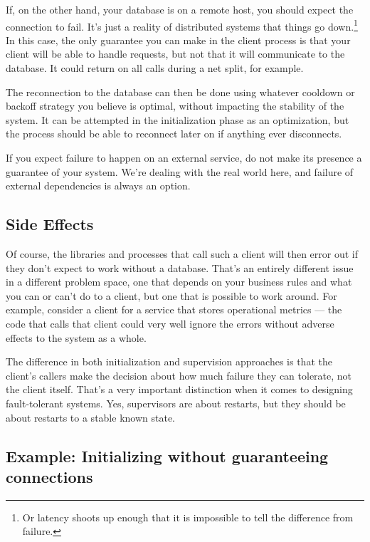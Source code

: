 If, on the other hand, your database is on a remote host, you should expect the connection to fail. It's just a reality of distributed systems that things go down.\footnote{Or latency shoots up enough that it is impossible to tell the difference from failure.} In this case, the only guarantee you can make in the client process is that your client will be able to handle requests, but not that it will communicate to the database. It could return  on all calls during a net split, for example.

The reconnection to the database can then be done using whatever cooldown or backoff strategy you believe is optimal, without impacting the stability of the system. It can be attempted in the initialization phase as an optimization, but the process should be able to reconnect later on if anything ever disconnects.

If you expect failure to happen on an external service, do not make its presence a guarantee of your system. We're dealing with the real world here, and failure of external dependencies is always an option. 

\subsection{Side Effects}
\label{subsec:start-link-side-effects}

Of course, the libraries and processes that call such a client will then error out if they don't expect to work without a database. That's an entirely different issue in a different problem space, one that depends on your business rules and what you can or can't do to a client, but one that is possible to work around. For example, consider a client for a service that stores operational metrics — the code that calls that client could very well ignore the errors without adverse effects to the system as a whole. 

The difference in both initialization and supervision approaches is that the client's callers make the decision about how much failure they can tolerate, not the client itself. That's a very important distinction when it comes to designing fault-tolerant systems. Yes, supervisors are about restarts, but they should be about restarts to a stable known state.

\subsection{Example: Initializing without guaranteeing connections}
\label{subsec:start-link-initializing-without-guaranteeing-connections}

